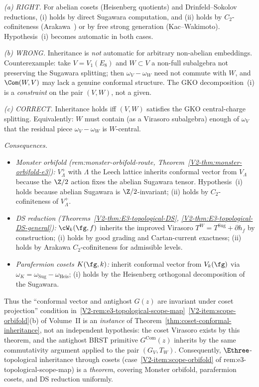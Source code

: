 \begin{remark}
\label{rem:coset-conformal-inheritance-scope}
\emph{(a) RIGHT.} For abelian cosets (Heisenberg quotients) and
Drinfeld--Sokolov reductions, (i) holds by direct Sugawara
computation, and (ii) holds by $C_2$-cofiniteness
(Arakawa~\cite{AraC2}) or by free strong generation
(Kac--Wakimoto). Hypothesis~(i) becomes automatic in both cases.

\emph{(b) WRONG.} Inheritance is \emph{not} automatic for
arbitrary non-abelian embeddings. Counterexample: take
$V = V_1(E_8)$ and $W \subset V$ a non-full subalgebra not
preserving the Sugawara splitting; then $\omega_V - \omega_W$
need not commute with $W$, and $\Com(W, V)$ may lack a
genuine conformal structure. The GKO decomposition~(i) is a
\emph{constraint} on the pair $(V, W)$, not a given.

\emph{(c) CORRECT.} Inheritance holds iff $(V, W)$ satisfies
the GKO central-charge splitting. Equivalently: $W$ must
contain (as a Virasoro subalgebra) enough of $\omega_V$ that
the residual piece $\omega_V - \omega_W$ is $W$-central.

\emph{Consequences.}
\begin{itemize}
\item \emph{Monster orbifold (rem:monster-orbifold-route,
 Theorem~\ref{V2-thm:monster-orbifold-e3}):} $V_\Lambda^+$ with
 $\Lambda$ the Leech lattice inherits conformal vector from
 $V_\Lambda$ because the $\Z/2$ action fixes the abelian
 Sugawara tensor. Hypothesis~(i) holds because abelian
 Sugawara is $\Z/2$-invariant; (ii) holds by
 $C_2$-cofiniteness of $V_\Lambda^+$.
\item \emph{DS reduction (Theorems~\ref{V2-thm:E3-topological-DS},
 \ref{V2-thm:E3-topological-DS-general}):} $\cW_k(\fg, f)$ inherits
 the improved Virasoro $T^W = T^{\mathrm{Sug}} + \partial h_f$
 by construction; (i) holds by good grading and Cartan-current
 exactness; (ii) holds by Arakawa $C_2$-cofiniteness for
 admissible levels.
\item \emph{Parafermion cosets $K(\fg, k)$:} inherit conformal
 vector from $V_k(\fg)$ via $\omega_K = \omega_{\mathrm{Sug}} -
 \omega_{\mathrm{Heis}}$; (i) holds by the Heisenberg
 orthogonal decomposition of the Sugawara.
\end{itemize}
Thus the ``conformal vector and antighost $G(z)$ are invariant
under coset projection'' condition
in~\ref{V2-rem:e3-topological-scope-map}~\ref{V2-item:scope-orbifold}(b)
of Volume~II is an \emph{instance} of
Theorem~\ref{thm:coset-conformal-inheritance},
not an independent hypothesis: the coset Virasoro exists by this
theorem, and the antighost BRST primitive $G^{\mathrm{Com}}(z)$
inherits by the same commutativity argument applied to the pair
$(G_V, T_W)$. Consequently, $\Ethree$-topological inheritance
through cosets (case~\ref{V2-item:scope-orbifold} of
rem:e3-topological-scope-map) is a \emph{theorem}, covering
Monster orbifold, parafermion cosets, and DS reduction
uniformly.
\end{remark}

